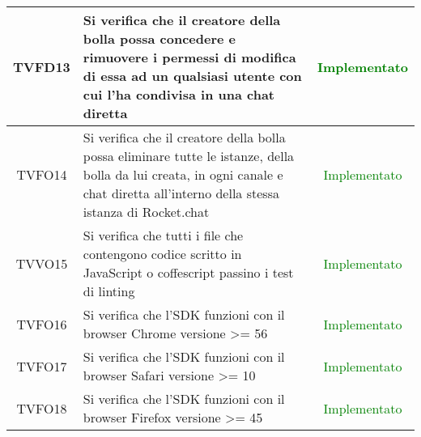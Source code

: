 \begin{center}
\begin{longtable}{|c|>{\centering}m{10cm}|c|}
		TVFD13 & Si verifica che il creatore della bolla possa concedere e rimuovere i permessi di modifica di essa ad un qualsiasi utente con cui l'ha condivisa in una chat diretta & \textcolor{Green}{Implementato}\\ \hline
		TVFO14 & Si verifica che il creatore della bolla possa eliminare tutte le istanze, della bolla da lui creata, in ogni canale e chat diretta all'interno della stessa istanza di Rocket.chat & \textcolor{Green}{Implementato}\\ \hline
		TVVO15 & Si verifica che tutti i file che contengono codice scritto in JavaScript o coffescript passino i test di linting & \textcolor{Green}{Implementato}\\ \hline
		TVFO16 & Si verifica che l'SDK funzioni con il browser Chrome versione >= 56 & \textcolor{Green}{Implementato}\\ \hline
		TVFO17 & Si verifica che l'SDK funzioni con il browser Safari versione >= 10 & \textcolor{Green}{Implementato}\\ \hline
		TVFO18 & Si verifica che l'SDK funzioni con il browser Firefox versione >= 45 & \textcolor{Green}{Implementato}\\ \hline
	\end{longtable}
\end{center}
